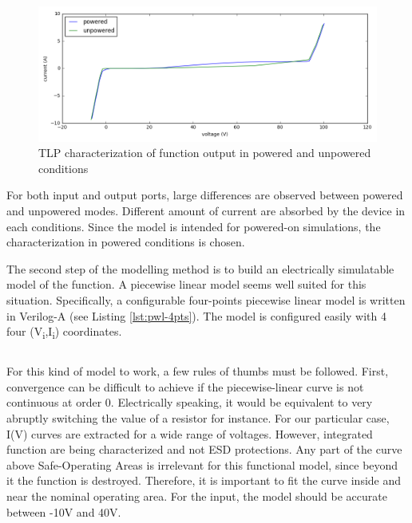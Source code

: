 \begin{figure}[!h]
  \centering
  \includegraphics[width=\textwidth]{src/4/figures/tlp_output_characterization.png}
  \caption{TLP characterization of function output in powered and unpowered conditions}
  \label{fig:tlp-output-cz}
\end{figure}

For both input and output ports, large differences are observed between powered and unpowered modes.
Different amount of current are absorbed by the device in each conditions.
Since the model is intended for powered-on simulations, the characterization in powered conditions is chosen.

The second step of the modelling method is to build an electrically simulatable model of the function.
A piecewise linear model seems well suited for this situation.
Specifically, a configurable four-points piecewise linear model is written in Verilog-A (see Listing \ref{lst:pwl-4pts}).
The model is configured easily with 4 four (V\textsubscript{i},I\textsubscript{i}) coordinates.

\begin{code}
\inputminted[frame=single]{verilog}{src/4/snippets/pwl_4pts.va}
\caption{Piecewise linear 4-points Verilog-A model}
\label{lst:pwl-4pts}
\end{code}


For this kind of model to work, a few rules of thumbs must be followed.
First, convergence can be difficult to achieve if the piecewise-linear curve is not continuous at order 0.
Electrically speaking, it would be equivalent to very abruptly switching the value of a resistor for instance.
For our particular case, I(V) curves are extracted for a wide range of voltages.
However, integrated function are being characterized and not ESD protections.
Any part of the curve above Safe-Operating Areas is irrelevant for this functional model, since beyond it the function is destroyed.
Therefore, it is important to fit the curve inside and near the nominal operating area.
For the input, the model should be accurate between -10V and 40V.

